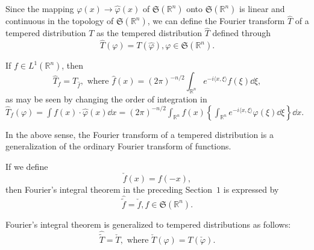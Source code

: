 
\begin{definition}\label{def:VI.2.Definition.4} Since the mapping $\varphi(x) \to \hat{\varphi}(x)$ of $\mathfrak{S}(\mathbb{R}^{n})$ onto $\mathfrak{S}(\mathbb{R}^{n})$ is linear and continuous in the topology of $\mathfrak{S}(\mathbb{R}^{n})$, we can define the Fourier transform $\hat{T}$ of a tempered distribution $T$ as the tempered distribution $\hat{T}$ defined through 
\begin{equation}\label{eq:VI.2.10}
\hat {T} (\varphi) = T (\hat {\varphi}), \varphi \in \mathfrak {S} (\mathbb{R}^{n}).
\end{equation}
\end{definition}

\begin{example}\label{ex:VI.2.Example.1a} If $f \in L^{1}(\mathbb{R}^{n})$, then 
\begin{equation}\label{eq:VI.2.11}
\hat {T} _{f} = T _ {\hat {f}}, \text{ where } \hat {f} (x) = (2 \pi) ^{-n/2} \int_ {\mathbb{R}^{n}} e ^{- i \langle x, \xi \rangle} f (\xi) \dd \xi ,
\end{equation}
as may be seen by changing the order of integration in $\hat{T}_f(\varphi) = \int f(x) \cdot \hat{\varphi}(x) \dd x = (2\pi)^{-n/2} \int_{\mathbb{R}^{n}} f(x) \left\{ \int_{\mathbb{R}^{n}} e^{-i\langle x, \xi \rangle} \varphi(\xi) \dd\xi \right\} \dd x.$ 
\end{example}

\begin{remarku} In the above sense, the Fourier transform of a tempered distribution is a generalization of the ordinary Fourier transform of functions. 
\end{remarku}

\begin{proposition}\label{prop:VI.2.Proposition.4} If we define 
\begin{equation}\label{eq:VI.2.12}
\check {f} (x) = f (- x),
\end{equation}
then Fourier's integral theorem in the preceding Section~\hyperref[sec:VI.1]{$1$} is expressed by 
\begin{equation}\label{eq:VI.2.13}
\hat {\tilde {f}} = \check {f}, f \in \mathfrak {S} (\mathbb{R}^{n}).
\end{equation}
\end{proposition}

\begin{corollary}\label{cor:VI.2.Corollary.1} Fourier's integral theorem is generalized to tempered distributions as follows: 
\begin{equation}\label{eq:VI.2.14}
\hat {\tilde {T}} = \check {T}, \text{ where } \check {T} (\varphi) = T (\check {\varphi}).
\end{equation}
\end{corollary}

